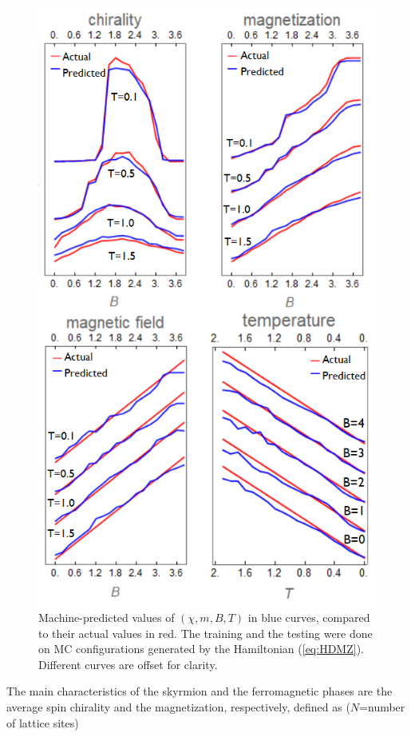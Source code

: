 \documentclass[reprint,amsmath,amssymb,aps,showpacs,superscriptaddress,prl]{revtex4-1}
\begin{document}
\begin{figure}[h]
\includegraphics[scale=0.6]{fig3.png}
\caption{Machine-predicted values of $(\chi, m, B, T)$ in blue curves, compared to their actual values in red. The training and the testing were done on MC configurations generated by the Hamiltonian (\ref{eq:HDMZ}). Different curves are offset for clarity.}\label{fig:2}
\end{figure}

The main characteristics of the skyrmion and the ferromagnetic phases are the average spin chirality and the magnetization, respectively, defined as ($N$=number of lattice sites)
\end{document}

